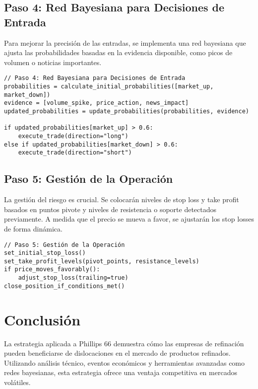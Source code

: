 \documentclass[12pt]{article}
\begin{document}
\subsection{Paso 4: Red Bayesiana para Decisiones de Entrada}
Para mejorar la precisión de las entradas, se implementa una red bayesiana que ajusta las probabilidades basadas en la evidencia disponible, como picos de volumen o noticias importantes.

\begin{verbatim}
// Paso 4: Red Bayesiana para Decisiones de Entrada
probabilities = calculate_initial_probabilities([market_up, market_down])
evidence = [volume_spike, price_action, news_impact]
updated_probabilities = update_probabilities(probabilities, evidence)

if updated_probabilities[market_up] > 0.6:
    execute_trade(direction="long")
else if updated_probabilities[market_down] > 0.6:
    execute_trade(direction="short")
\end{verbatim}

\subsection{Paso 5: Gestión de la Operación}
La gestión del riesgo es crucial. Se colocarán niveles de stop loss y take profit basados en puntos pivote y niveles de resistencia o soporte detectados previamente. A medida que el precio se mueva a favor, se ajustarán los stop losses de forma dinámica.

\begin{verbatim}
// Paso 5: Gestión de la Operación
set_initial_stop_loss()
set_take_profit_levels(pivot_points, resistance_levels)
if price_moves_favorably():
    adjust_stop_loss(trailing=true)
close_position_if_conditions_met()
\end{verbatim}

\section{Conclusión}
La estrategia aplicada a Phillips 66 demuestra cómo las empresas de refinación pueden beneficiarse de dislocaciones en el mercado de productos refinados. Utilizando análisis técnico, eventos económicos y herramientas avanzadas como redes bayesianas, esta estrategia ofrece una ventaja competitiva en mercados volátiles.
\end{document}
